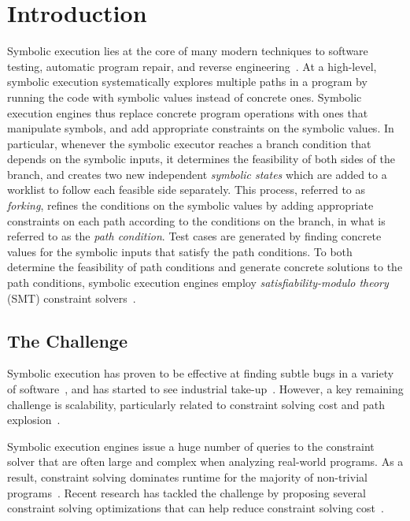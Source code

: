 
\chapter{Introduction}\label{text:introduction}

Symbolic execution lies at the core of many modern techniques to
software testing, automatic program repair, and reverse
engineering~\cite{dart,cute,klee,semfix,chipounov2010reverse,JPF-SE}. At
a high-level, symbolic execution systematically explores multiple
paths in a program by running the code with symbolic values instead of
concrete ones. Symbolic execution engines thus replace concrete
program operations with ones that manipulate symbols, and add
appropriate constraints on the symbolic values. In particular,
whenever the symbolic executor reaches a branch condition that depends
on the symbolic inputs, it determines the feasibility of both sides of
the branch, and creates two new independent \emph{symbolic states}
which are added to a worklist to follow each feasible side
separately. This process, referred to as \emph{forking}, refines the
conditions on the symbolic values by adding appropriate constraints on
each path according to the conditions on the branch, in what is
referred to as the \textit{path condition}.  Test cases are generated
by finding concrete values for the symbolic inputs that satisfy the
path conditions.  To both determine the feasibility of path conditions
and generate concrete solutions to the path conditions, symbolic
execution engines employ \emph{satisfiability-modulo theory} (SMT)
constraint solvers~\cite{smt:cacm11}.

\section{The Challenge}
Symbolic execution has proven to be effective at finding subtle bugs
in a variety of software~\cite{klee,exe,JPF-SE,pex,sage}, and has
started to see industrial
take-up~\cite{symex-impact-11,sage,mayhem12}. However, a key remaining
challenge is scalability, particularly related to constraint solving
cost and path explosion~\cite{symex:cacm}.

Symbolic execution engines issue a huge number of queries to the
constraint solver that are often large and complex when analyzing
real-world programs. As a result, constraint solving dominates runtime
for the majority of non-trivial
programs~\cite{klee-multisolver,incremental-smt:hvc14}. Recent
research has tackled the challenge by proposing several constraint
solving optimizations that can help reduce constraint solving
cost~\cite{exe,cute,constraint-opt:cstva11,memoized:symex,
  green,greentrie,recal,klee-multisolver,klee-array}.

